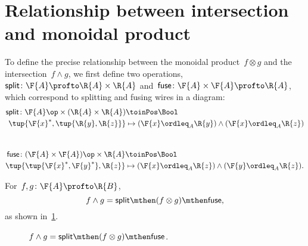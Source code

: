 \section{Relationship between intersection and monoidal product}
To define the precise relationship between the monoidal product~$f \otimes g$  and the intersection~$f \wedge g$, we first define two operations,~$\mathsf{split} \colon \F{A} \profto \R{A} \times \R{A}$ and~$\mathsf{fuse} \colon \F{A} \times \F{A} \profto \R{A}$, which correspond to splitting and fusing wires in a diagram:
\begin{equation}
    \begin{aligned}
        \mathsf{split} \colon \F{A}\op \times (\R{A} \times \R{A}) & \toinPos \Bool \\
        \tup{\F{x}^*, \tup{\R{y}, \R{z}}}                          & \mapsto (\F{x} \ordleq_A \R{y}) \wedge (\F{x} \ordleq_A \R{z})
    \end{aligned}
\end{equation}
~
\begin{equation}
    \begin{aligned}
        \mathsf{fuse} \colon (\F{A} \times \F{A})\op \times \R{A} & \toinPos  \Bool \\
        \tup{\tup{\F{x}^*, \F{y}^*}, \R{z}}                       & \mapsto (\F{x} \ordleq_A \R{z}) \wedge (\F{y} \ordleq_A \R{z}).
    \end{aligned}
\end{equation}

\begin{lemma}
    \label{lem:intersection_split}
    For~$f,g \colon \F{A} \profto \R{B}$,
    \begin{equation}
        f \wedge g = \mathsf{split} \mthen (f \otimes g) \mthen \mathsf{fuse},
    \end{equation}
    as shown in~\cref{fig:lemmasplitfuse}.
    \begin{figure}[h!]
        \begin{center}
        \end{center}
        \caption{$f \wedge g = \mathsf{split} \mthen (f \otimes g) \mthen \mathsf{fuse}$. }
        \label{fig:lemmasplitfuse}
    \end{figure}
\end{lemma}

